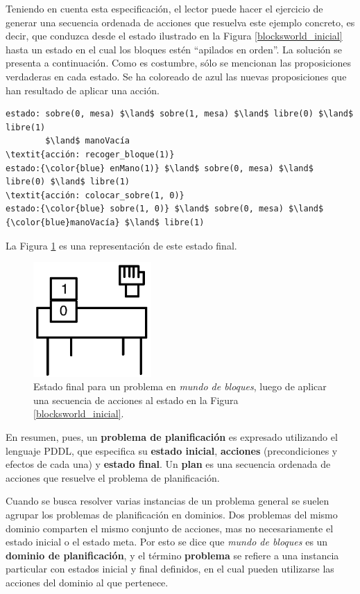 Teniendo en cuenta esta especificación, el lector puede hacer el ejercicio de
generar una secuencia ordenada de acciones que resuelva este ejemplo
concreto, es decir, que conduzca desde el estado ilustrado en la Figura
\ref{blocksworld_inicial} hasta un estado en el cual los bloques estén ``apilados en
orden''. La solución se presenta a continuación. Como es costumbre, sólo se
mencionan las proposiciones verdaderas en cada estado. Se ha coloreado de azul
las nuevas proposiciones que han resultado de aplicar una acción.
\begin{Verbatim}[commandchars=\\\{\},
codes={\catcode`$=3\catcode`^=7}]
estado: sobre(0, mesa) $\land$ sobre(1, mesa) $\land$ libre(0) $\land$ libre(1)
        $\land$ manoVacía
\textit{acción: recoger_bloque(1)}
estado:{\color{blue} enMano(1)} $\land$ sobre(0, mesa) $\land$ libre(0) $\land$ libre(1)
\textit{acción: colocar_sobre(1, 0)}
estado:{\color{blue} sobre(1, 0)} $\land$ sobre(0, mesa) $\land$ {\color{blue}manoVacía} $\land$ libre(1)
\end{Verbatim}

La Figura \ref{blocksworld_final} es una representación de este estado final.

\begin{figure}[h!]
\centering
\includegraphics[width=0.4\textwidth]{figuras/blocksworld_final.png}
\caption{Estado final para un problema en \textit{mundo de bloques},
luego de aplicar una secuencia de acciones al estado en la Figura \ref{blocksworld_inicial}.}
\label{blocksworld_final}
\end{figure}

En resumen, pues, un \textbf{problema de planificación} es expresado utilizando
el lenguaje PDDL, que especifica su \textbf{estado inicial}, \textbf{acciones}
(precondiciones y efectos de cada una) y \textbf{estado final}.
Un \textbf{plan} es una secuencia ordenada de acciones que resuelve el problema
de planificación.

Cuando se busca resolver varias instancias de un problema general se suelen
agrupar los problemas de planificación en dominios. Dos problemas del mismo
dominio comparten el mismo conjunto de acciones, mas no necesariamente el
estado inicial o el estado meta. Por esto se dice que \textit{mundo de bloques}
es un \textbf{dominio de planificación}, y el término \textbf{problema} se refiere a
una instancia particular con estados inicial y final definidos, en
el cual pueden utilizarse las acciones del dominio al que pertenece.

